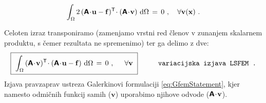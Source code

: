 \begin{equation}
	\int_{\Omega} 2 \, (\mathbsf{A} \! \cdot \! \mathbf{u} - \mathbf{f})^\mathsf{T} \! \cdot (\mathbsf{A} \! \cdot \! \mathbf{v}) \ \ud \Omega \, = \, 0 \ , \quad \forall \mathbf{v(\mathbf{x})} \ . \vphantom{\Biggr{)}}
\end{equation}
Celoten izraz transponiramo (zamenjamo vrstni red členov v zunanjem skalarnem produktu, s čemer rezultata ne spremenimo) ter ga delimo z dve:
\begin{equation}
	\boxed{\
		\int_{\Omega} \, (\mathbsf{A} \! \cdot \! \mathbf{v})^\mathsf{T} \! \cdot (\mathbsf{A} \! \cdot \! \mathbf{u} - \mathbf{f}) \ \ud \Omega \, = \,
		0 \ , \hspace{5mm} \forall \mathbf{v} \vphantom{\bigg{)}} \
	}
	\hspace{10mm} \texttt{variacijska izjava LSFEM .}
\end{equation}
Izjava pravzaprav ustreza Galerkinovi formulaciji \eqref{eq:GfemStatement}, kjer namesto odmičnih funkcij samih ($\mathbf{v}$) uporabimo njihove odvode ($\bm{\mathsf{A}} \! \cdot \! \mathbf{v}$).